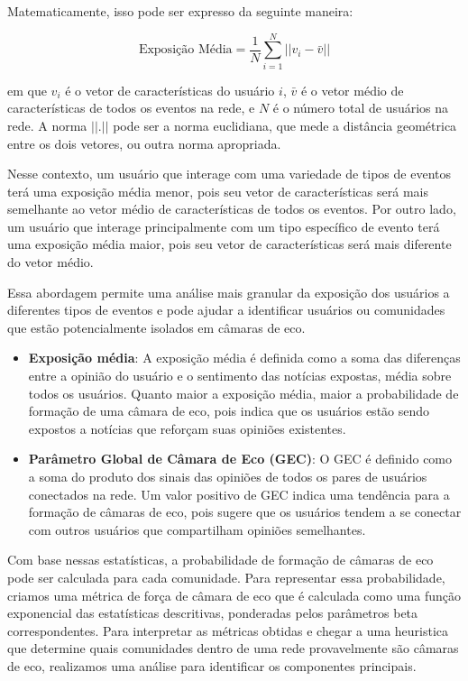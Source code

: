 Matematicamente, isso pode ser expresso da seguinte maneira:

\begin{equation}
	\text{{Exposição Média}} = \frac{1}{N} \sum_{i=1}^{N} ||v_i - \bar{v}||
\end{equation}

em que $v_i$ é o vetor de características do usuário $i$, $\bar{v}$ é o vetor médio de características de todos os eventos na rede, e $N$ é o número total de usuários na rede. A norma $||.||$ pode ser a norma euclidiana, que mede a distância geométrica entre os dois vetores, ou outra norma apropriada.

Nesse contexto, um usuário que interage com uma variedade de tipos de eventos terá uma exposição média menor, pois seu vetor de características será mais semelhante ao vetor médio de características de todos os eventos. Por outro lado, um usuário que interage principalmente com um tipo específico de evento terá uma exposição média maior, pois seu vetor de características será mais diferente do vetor médio.

Essa abordagem permite uma análise mais granular da exposição dos usuários a diferentes tipos de eventos e pode ajudar a identificar usuários ou comunidades que estão potencialmente isolados em câmaras de eco.

\begin{itemize}
	\item \textbf{Exposição média}: A exposição média é definida como a soma das diferenças entre a opinião do usuário e o sentimento das notícias expostas, média sobre todos os usuários. Quanto maior a exposição média, maior a probabilidade de formação de uma câmara de eco, pois indica que os usuários estão sendo expostos a notícias que reforçam suas opiniões existentes.
	\item \textbf{Parâmetro Global de Câmara de Eco (GEC)}: O GEC é definido como a soma do produto dos sinais das opiniões de todos os pares de usuários conectados na rede. Um valor positivo de GEC indica uma tendência para a formação de câmaras de eco, pois sugere que os usuários tendem a se conectar com outros usuários que compartilham opiniões semelhantes.
\end{itemize}

Com base nessas estatísticas, a probabilidade de formação de câmaras de eco pode ser calculada para cada comunidade. Para representar essa probabilidade, criamos uma métrica de força de câmara de eco que é calculada como uma função exponencial das estatísticas descritivas, ponderadas pelos parâmetros beta correspondentes. Para interpretar as métricas obtidas e chegar a uma heuristica que determine quais comunidades dentro de uma rede provavelmente são câmaras de eco, realizamos uma análise para identificar os componentes principais.

